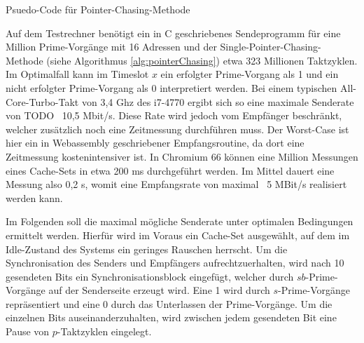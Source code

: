 \begin{algorithm}[h]
\DontPrintSemicolon
\caption{Psuedo-Code für Pointer-Chasing-Methode}
\label{alg:pointerChasing}


\end{algorithm}

Auf dem Testrechner benötigt ein in C geschriebenes Sendeprogramm für eine Million Prime-Vorgänge mit 16 Adressen und der Single-Pointer-Chasing-Methode (siehe Algorithmus \ref{alg:pointerChasing}) etwa 323 Millionen Taktzyklen.
Im Optimalfall kann im Timeslot $x$ ein erfolgter Prime-Vorgang als 1 und ein nicht erfolgter Prime-Vorgang als 0 interpretiert werden.
Bei einem typischen All-Core-Turbo-Takt von 3,4 Ghz des i7-4770 ergibt sich so eine maximale Senderate von TODO ~10,5 Mbit/s.
Diese Rate wird jedoch vom Empfänger beschränkt, welcher zusätzlich noch eine Zeitmessung durchführen muss. Der Worst-Case ist hier ein in Webassembly geschriebener Empfangsroutine, da dort eine Zeitmessung kostenintensiver ist. In Chromium 66 können eine Million Messungen eines Cache-Sets in etwa 200 ms durchgeführt werden. Im Mittel dauert eine Messung also 0,2 \textmu s, womit eine Empfangsrate von maximal ~5 MBit/s realisiert werden kann.

Im Folgenden soll die maximal mögliche Senderate unter optimalen Bedingungen ermittelt werden. 
Hierfür wird im Voraus ein Cache-Set ausgewählt, auf dem im Idle-Zustand des Systems ein geringes Rauschen herrscht.
Um die Synchronisation des Senders und Empfängers aufrechtzuerhalten, wird nach 10 gesendeten Bits ein Synchronisationsblock eingefügt, welcher durch $sb$-Prime-Vorgänge auf der Senderseite erzeugt wird. 
Eine 1 wird durch $s$-Prime-Vorgänge repräsentiert und eine 0 durch das Unterlassen der Prime-Vorgänge. 
Um die einzelnen Bits auseinanderzuhalten, wird zwischen jedem gesendeten Bit eine Pause von $p$-Taktzyklen eingelegt.






